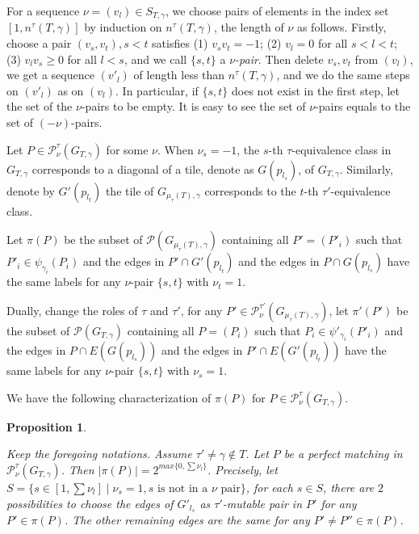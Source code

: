 \documentclass[10pt]{amsart}
\theoremstyle{theorems}
\newtheorem{Proposition}[Theorem]{Proposition}
\begin{document}
\medskip

For a sequence $\nu=(v_l)\in S_{T,\gamma}$, we choose pairs of elements in the index set $[1,n^{\tau}(T,\gamma)]$ by induction on $n^{\tau}(T,\gamma)$, the length of $\nu$ as follows. Firstly, choose a pair $(v_s,v_t), s<t$ satisfies (1) $v_sv_t=-1$; (2) $v_l=0$ for all $s<l<t$; (3) $v_lv_s\geq 0$ for all $l<s$, and we call $\{s,t\}$ a \emph{$\nu$-pair}. Then delete $v_s,v_t$ from $(v_l)$, we get a sequence $(v'_l)$ of length less than $n^{\tau}(T,\gamma)$, and we do the same steps on $(v'_l)$ as on $(v_l)$. In particular, if $\{s,t\}$ does not exist in the first step, let the set of the $\nu$-pairs to be empty. It is easy to see the set of $\nu$-pairs equals to the set of $(-\nu)$-pairs.

\medskip

Let $P\in \mathcal P^{\tau}_{\nu}(G_{T,\gamma})$ for some $\nu$. When $\nu_s=-1$, the $s$-th $\tau$-equivalence class in $G_{T,\gamma}$ corresponds to a diagonal of a tile, denote as $G(p_{l_s})$, of $G_{T,\gamma}$. Similarly, denote by $G'(p_{l_t})$ the tile of $G_{\mu_{\tau}(T),\gamma}$ corresponds to the $t$-th $\tau'$-equivalence class.

\medskip

Let $\pi(P)$ be the subset of $\mathcal P(G_{\mu_{\tau}(T),\gamma})$ containing all $P'=(P'_i)$ such that $P'_i\in \psi_{\gamma_i}(P_i)$ and the edges in $P'\cap G'(p_{l_t})$ and the edges in $P\cap G(p_{l_s})$ have the same labels for any $\nu$-pair $\{s,t\}$ with $\nu_t=1$.

\medskip

Dually, change the roles of $\tau$ and $\tau'$, for any $P'\in \mathcal P^{\tau'}_{\nu}(G_{\mu_{\tau}(T),\gamma})$, let $\pi'(P')$ be the subset of $\mathcal P(G_{T,\gamma})$ containing all $P=(P_i)$ such that $P_i\in \psi'_{\gamma_i}(P'_i)$ and the edges in $P\cap E(G(p_{l_s}))$ and the edges in $P'\cap E(G'(p_{l_t}))$ have the same labels for any $\nu$-pair $\{s,t\}$ with $\nu_s=1$.

\medskip

We have the following characterization of $\pi(P)$ for $P\in \mathcal P^{\tau}_{\nu}(G_{T,\gamma})$.

\medskip

\begin{Proposition}\label{2^n}

Keep the foregoing notations. Assume $\tau'\neq \gamma \notin T$. Let $P$ be a perfect matching in $\mathcal P^{\tau}_{\nu}(G_{T,\gamma})$. Then $|\pi(P)|=2^{max\{0, \sum\nu_l\}}$. Precisely, let $S=\{s\in [1,\sum\nu_l]\mid \nu_s=1, s \text{ is not in a }\nu\text{ pair}\}$, for each $s\in S$, there are $2$ possibilities to choose the edges of $G'_{l_{s}}$ as $\tau'$-mutable pair in $P'$ for any $P'\in \pi(P)$. The other remaining edges are the same for any $P'\neq P''\in \pi(P)$.

\end{Proposition}
\end{document}
